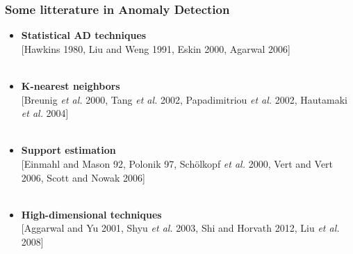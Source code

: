 \documentclass[9pt]{beamer}
\begin{document}
\begin{frame}
\frametitle{Some litterature in Anomaly Detection}
\begin{itemize}
\item \textbf{Statistical AD techniques}\\
{\small [Hawkins 1980, Liu and Weng 1991, Eskin 2000, Agarwal 2006]}\\~\\


\item \textbf{K-nearest neighbors}\\
{\small [Breunig \emph{et al.} 2000, Tang \emph{et al.} 2002, Papadimitriou \emph{et al.} 2002, Hautamaki \emph{et al.} 2004]}\\~\\




\item \textbf{Support estimation}\\
{\small [Einmahl and Mason 92, Polonik 97, Sch{\"o}lkopf \emph{et al.} 2000, Vert and Vert 2006, Scott and Nowak 2006]}\\~\\


\item \textbf{High-dimensional techniques}\\
{\small [Aggarwal and Yu 2001, Shyu \emph{et al.} 2003, Shi and Horvath 2012, Liu \emph{et al.} 2008]}


\end{itemize}
\end{frame}
\end{document}
